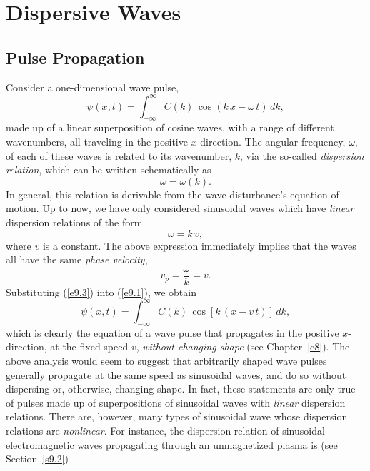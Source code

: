 \chapter{Dispersive Waves}
\section{Pulse Propagation}\label{s9.1}
Consider a one-dimensional  wave pulse,
\begin{equation}\label{e9.1}
\psi(x,t) = \int_{-\infty}^\infty C(k)\,\cos(k\,x-\omega\,t)\,dk,
\end{equation}
 made up of a linear superposition of cosine waves, with a range of different wavenumbers, all
traveling in the positive $x$-direction. The angular frequency, $\omega$,
 of each of these waves is related to its wavenumber, $k$, via the so-called
{\em dispersion relation}, which can be written schematically as
\begin{equation}
\omega = \omega(k).
\end{equation}
In general, this relation is derivable from the wave disturbance's equation of motion. 
Up to now, we have only considered sinusoidal waves which have {\em linear}\/ dispersion
relations  of the form
\begin{equation}\label{e9.3}
\omega = k\,v,
\end{equation}
where $v$ is a constant. The above expression immediately implies that  the waves all have the same {\em phase velocity},
\begin{equation}
v_p = \frac{\omega}{k} = v.
\end{equation}
 Substituting (\ref{e9.3}) into (\ref{e9.1}),
we obtain
\begin{equation}
\psi(x,t)=\int_{-\infty}^\infty C(k)\,\cos[k\,(x-v\,t)]\,dk,
\end{equation}
which is clearly the equation of a wave pulse that propagates in the positive
$x$-direction, at the fixed speed $v$, {\em without changing shape}\/ (see Chapter~\ref{c8}). The above analysis would
seem to suggest that arbitrarily shaped  wave pulses generally propagate at the same speed as sinusoidal
waves, and do so without dispersing or, otherwise, changing shape. In fact,
these statements are only true of pulses made up of superpositions of sinusoidal waves with {\em linear}\/ dispersion
relations. There are, however, many types of sinusoidal wave whose dispersion relations
are {\em nonlinear}. For instance, the dispersion relation of sinusoidal
electromagnetic waves propagating through an unmagnetized plasma is (see Section~\ref{s9.2})
